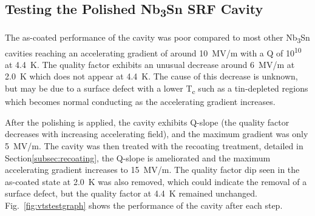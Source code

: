 \documentclass[reprint,amsmath,amssymb,aps]{revtex4-2}%
\begin{document}
%
\subsection{Testing the Polished Nb\textsubscript{3}Sn SRF Cavity}%
\label{subsec:cavityresults}%
The as-coated performance of the cavity was poor compared to most other Nb\textsubscript{3}Sn cavities reaching an accelerating gradient of around 10~MV/m with a Q of 10\textsuperscript{10} at 4.4~K. The quality factor exhibits an unusual decrease around 6~MV/m at 2.0~K which does not appear at 4.4~K. The cause of this decrease is unknown, but may be due to a surface defect with a lower T\textsubscript{c} such as a tin-depleted regions which becomes normal conducting as the accelerating gradient increases.

After the polishing is applied, the cavity exhibits Q-slope (the quality factor decreases with increasing accelerating field), and the maximum gradient was only 5~MV/m. The cavity was then treated with the recoating treatment, detailed in Section\ref{subsec:recoating}, the Q-slope is ameliorated and the maximum accelerating gradient increases to 15~MV/m. The quality factor dip seen in the as-coated state at 2.0~K was also removed, which could indicate the removal of a surface defect, but the quality factor at 4.4~K remained unchanged. Fig.~\ref{fig:vtstestgraph} shows the performance of the cavity after each step.
%
\end{document}
